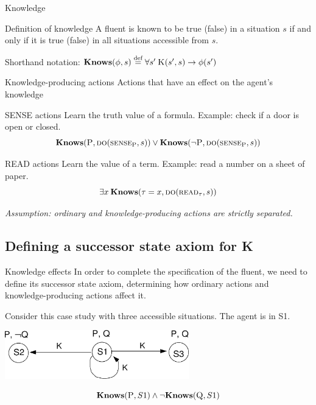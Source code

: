 \begin{frame}{Knowledge}
    \begin{block}{Definition of knowledge}
        A fluent is known to be true (false) in a situation \(s\)
        if and only if it is true (false)
        in all situations accessible from \(s\).
    \end{block}

    Shorthand notation: \( \textbf{Knows}(\phi, s) \stackrel{\text{def}}{=} \forall s' \: \textsc{K}(s',s) \rightarrow \phi(s') \)
\end{frame}

\begin{frame}{Knowledge-producing actions}
    Actions that have an effect on the agent's knowledge

    \begin{block}{SENSE actions}
        Learn the truth value of a formula. Example: check if a door is open or closed.
        \[
            \textbf{Knows}(\textsc{P}, \textsc{do}(\textsc{sense}_\text{P}, s))
            \lor
            \textbf{Knows}(\lnot \textsc{P}, \textsc{do}(\textsc{sense}_\text{P}, s))
        \]
    \end{block}

    \begin{block}{READ actions}
        Learn the value of a term. Example: read a number on a sheet of paper.
        \[
            \exists x \: \textbf{Knows}(\tau = x, \textsc{do}(\textsc{read}_\tau, s))
        \]
    \end{block}

    \emph{Assumption: ordinary and knowledge-producing actions are strictly separated.}
\end{frame}

\subsection{Defining a successor state axiom for K}

\begin{frame}{Knowledge effects}
    In order to complete the specification of the \sck fluent,
    we need to define its successor state axiom,
    determining how ordinary actions and knowledge-producing actions affect it.

    Consider this case study with three accessible situations. The agent is in S1.

    \begin{center}
        \includegraphics[width=0.6\textwidth]{assets/3states_noactions.png}
    \end{center}

    \[ \textbf{Knows}(\textsc{P}, S1) \land \lnot \textbf{Knows}(\textsc{Q}, S1) \]
\end{frame}

